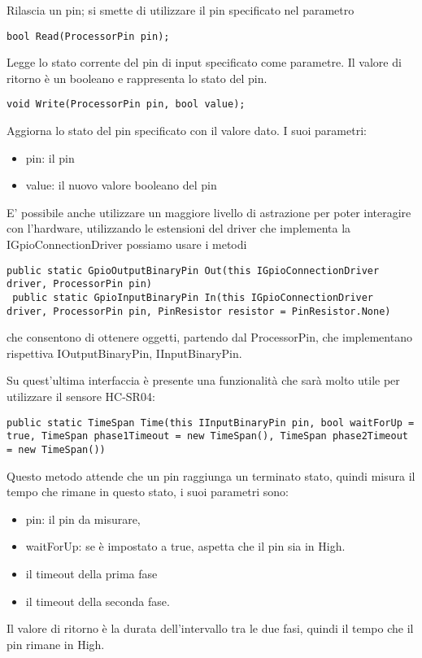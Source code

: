    Rilascia un pin; si smette di utilizzare il pin specificato nel parametro
 
   
 
      
  \begin{lstlisting}[frame=none]
   bool Read(ProcessorPin pin);
  \end{lstlisting}
  
   Legge lo stato corrente del pin di input specificato come parametre. Il valore di ritorno è un booleano e rappresenta lo stato del pin. 
  

\begin{lstlisting}[frame=none]
void Write(ProcessorPin pin, bool value);
\end{lstlisting}
Aggiorna lo stato del pin specificato con il valore dato. I suoi parametri:
\begin{itemize}
\item	pin: il pin
\item	value: il nuovo valore booleano del pin
\end{itemize}
 E' possibile anche utilizzare un maggiore livello di astrazione per poter interagire con l'hardware,
 utilizzando le estensioni del driver che implementa la IGpioConnectionDriver possiamo usare i metodi
   \begin{lstlisting}[frame=none]
 public static GpioOutputBinaryPin Out(this IGpioConnectionDriver driver, ProcessorPin pin)
 public static GpioInputBinaryPin In(this IGpioConnectionDriver driver, ProcessorPin pin, PinResistor resistor = PinResistor.None)
 \end{lstlisting}
che consentono di ottenere oggetti, partendo dal ProcessorPin, che implementano rispettiva IOutputBinaryPin, IInputBinaryPin.

Su quest'ultima interfaccia è presente una funzionalità che sarà molto utile per utilizzare il sensore HC-SR04:

\begin{lstlisting}[frame=none]
public static TimeSpan Time(this IInputBinaryPin pin, bool waitForUp = true, TimeSpan phase1Timeout = new TimeSpan(), TimeSpan phase2Timeout = new TimeSpan())

\end{lstlisting}
Questo metodo attende che un pin raggiunga un terminato stato, quindi misura il tempo che rimane in questo stato, i suoi parametri sono:
\begin{itemize}
	 \item pin: il pin da misurare,
	 \item waitForUp: se è impostato a true, aspetta che il pin sia in High.
	 \item il timeout della prima fase
	 \item il timeout della seconda fase.
\end{itemize}
Il valore di ritorno è la durata dell'intervallo tra le due fasi, quindi il tempo che il pin rimane in High.
  
